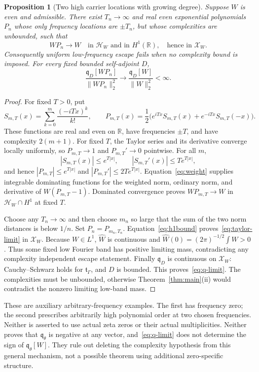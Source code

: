 \documentclass[11pt]{article}
\newtheorem{proposition}[theorem]{Proposition}
\theoremstyle{definition}
\theoremstyle{remark}
\newcommand{\R}{\mathbb R}
\newcommand{\HH}{\mathcal H_W}
\newcommand{\XX}{\mathcal X_W}
\newcommand{\tg}{\mathfrak t_\Gamma}
\newcommand{\qD}{\mathfrak q_D}
\newcommand{\qth}{\mathfrak q_\theta}
\newcommand{\norm}[1]{\lVert #1\rVert}
\begin{document}
\begin{proposition}[Two high carrier locations with growing degree]\label{prop:escape-counter}
Suppose $W$ is even and admissible. There exist $T_n\to\infty$ and real
even exponential polynomials $P_n$ whose only frequency locations are
$\pm T_n$, but whose complexities are unbounded, such that
\begin{equation}\label{eq:taylor-limit}
 WP_n\longrightarrow W\quad\text{in }\HH\text{ and in }H^1(\R),
 \quad\text{hence in }\XX.
\end{equation}
Consequently uniform low-frequency escape fails when no complexity bound
is imposed. For every fixed bounded self-adjoint $D$,
\begin{equation}\label{eq:q-limit}
 \frac{\qD[WP_n]}{\norm{WP_n}_2^2}
 \longrightarrow\frac{\qD[W]}{\norm W_2^2}<\infty.
\end{equation}
\end{proposition}
\begin{proof}
For fixed $T>0$, put
\[
 S_{m,T}(x)=\sum_{k=0}^m\frac{(-iTx)^k}{k!},\qquad
 P_{m,T}(x)=\frac12\bigl(e^{iTx}S_{m,T}(x)
 +e^{-iTx}S_{m,T}(-x)\bigr).
\]
These functions are real and even on $\R$, have frequencies $\pm T$, and
have complexity $2(m+1)$. For fixed $T$, the Taylor series and its derivative
converge locally uniformly, so $P_{m,T}\to1$ and $P_{m,T}'\to0$ pointwise.
For all $m$,
\[
 |S_{m,T}(x)|\le e^{T|x|},\qquad
 |S_{m,T}'(x)|\le T e^{T|x|},
\]
and hence $|P_{m,T}|\le e^{T|x|}$ and
$|P_{m,T}'|\le2T e^{T|x|}$. Equation~\eqref{eq:weight} supplies integrable
dominating functions for the weighted norm, ordinary norm, and derivative
of $W(P_{m,T}-1)$. Dominated convergence proves
$WP_{m,T}\to W$ in $\HH\cap H^1$ at fixed $T$.

Choose any $T_n\to\infty$ and then choose $m_n$ so large that the sum of
the two norm distances is below $1/n$. Set $P_n=P_{m_n,T_n}$.
Equation~\eqref{eq:h1bound} proves~\eqref{eq:taylor-limit} in $\XX$.
Because $W\in L^1$, $\widehat W$ is continuous and
$\widehat W(0)=(2\pi)^{-1/2}\int W>0$.
Thus some fixed low Fourier band has positive limiting mass, contradicting
any complexity independent escape statement. Finally $\qD$ is continuous
on $\XX$: Cauchy--Schwarz holds for $\tg$, and $D$ is bounded.
This proves~\eqref{eq:q-limit}. The complexities must be unbounded,
otherwise Theorem~\ref{thm:main}\textup{(ii)} would contradict the
nonzero limiting low-band mass.
\end{proof}

These are auxiliary arbitrary-frequency examples. The first has frequency
zero; the second prescribes arbitrarily high polynomial order at two
chosen frequencies. Neither is asserted to use actual zeta zeros or their
actual multiplicities. Neither proves that $\qth$ is negative at any
vector, and~\eqref{eq:q-limit} does not determine the sign of $\qth[W]$.
They rule out deleting the complexity hypothesis from this general
mechanism, not a possible theorem using additional zero-specific structure.
\end{document}
